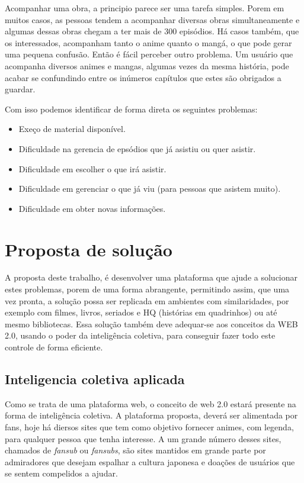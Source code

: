 \documentclass[
	12pt,				%
	openright,			%
	twoside,			%
	a4paper,			%
	Times,
	brazil,				%
	]{abntex2}
\begin{document}
Acompanhar uma obra, a principio parece ser uma tarefa simples. Porem em muitos casos, as pessoas tendem a acompanhar diversas obras simultaneamente e algumas dessas obras chegam a ter mais de 300 episódios. Há casos também, que os interessados, acompanham tanto o anime quanto o mangá, o que pode gerar uma pequena confusão. Então é fácil perceber outro problema. Um usuário que acompanha diversos animes e mangas, algumas vezes da mesma história, pode acabar se confundindo entre os inúmeros capítulos que estes são obrigados a guardar.
\par

Com isso podemos identificar de forma direta os seguintes problemas:
\begin{itemize}
	\item{Exeço de material disponível.}
	\item{Dificuldade na gerencia de epsódios que já asistiu ou quer asistir.}
	\item{Dificuldade em escolher o que irá asistir.}
	\item{Dificuldade em gerenciar o que já viu (para pessoas que asistem muito).} 
	\item{Dificuldade em obter novas informações.}
\end{itemize}

\par

\section{Proposta de solução}

A proposta deste trabalho, é desenvolver uma plataforma que ajude a solucionar estes problemas, porem de uma forma abrangente, permitindo assim, que uma vez pronta, a solução possa ser replicada em ambientes com similaridades, por exemplo com filmes, livros, seriados e HQ (histórias em quadrinhos) ou até mesmo bibliotecas. Essa solução também deve adequar-se aos conceitos da WEB 2.0, usando o poder da inteligência coletiva, para conseguir fazer todo este controle de forma eficiente. 
\par

\subsection{Inteligencia coletiva aplicada}

Como se trata de uma plataforma web, o conceito de web 2.0 estará presente na forma de inteligência coletiva. A plataforma proposta, deverá ser alimentada por fans, hoje há diersos sites que tem como objetivo fornecer animes, com legenda, para qualquer pessoa que tenha interesse. A um grande número desses sites, chamados de \textit{fansub} ou \textit{fansubs}, são sites mantidos em grande parte por admiradores que desejam espalhar a cultura japonesa e doações de usuários que se sentem compelidos a ajudar.
\par 
\end{document}
